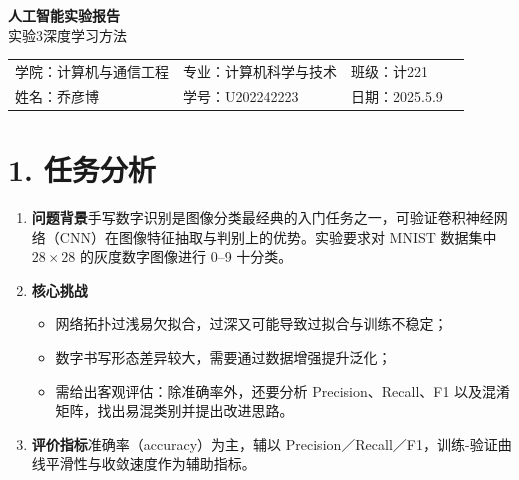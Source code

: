\documentclass[UTF8]{article}
\begin{document}
\begin{center}
  {\bfseries 人工智能实验报告}\\[1ex]
  { 实验3\quad 深度学习方法}
\end{center}

\renewcommand{\arraystretch}{1.6}
\begin{tabular}{p{5cm}p{5.5cm}p{3cm}p{5.5cm}}
  学院：计算机与通信工程 & 专业：计算机科学与技术 & 班级：计221\\
  姓名：乔彦博 & 学号：U202242223 & 日期：2025.5.9\\
\end{tabular}

\section*{1. 任务分析}
\begin{enumerate}
    \item \textbf{问题背景}\;手写数字识别是图像分类最经典的入门任务之一，可验证卷积神经网络（CNN）在图像特征抽取与判别上的优势。实验要求对 MNIST 数据集中 $28\times28$ 的灰度数字图像进行 0–9 十分类。
    \item \textbf{核心挑战}\;
          \begin{itemize}
              \item 网络拓扑过浅易欠拟合，过深又可能导致过拟合与训练不稳定；
              \item 数字书写形态差异较大，需要通过数据增强提升泛化；
              \item 需给出客观评估：除准确率外，还要分析 Precision、Recall、F1 以及混淆矩阵，找出易混类别并提出改进思路。
          \end{itemize}
    \item \textbf{评价指标}\;准确率（accuracy）为主，辅以 Precision／Recall／F1，训练-验证曲线平滑性与收敛速度作为辅助指标。
\end{enumerate}

\end{document}
